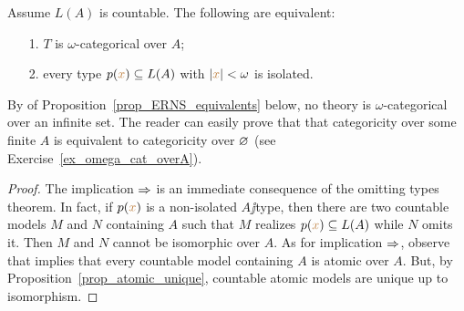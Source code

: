 \documentclass[creche.tex]{subfiles}
\begin{document}
\begin{theorem} Assume $L(A)$ is countable. The following are equivalent:
\begin{itemize}   
\item[1.] $T$ is $\omega$-categorical over $A$;
\item[2.] every type $p({\color{brown} x})\subseteq L(A)$ with $|{\color{brown} x}|<\omega$ is isolated. 
\end{itemize}
\end{theorem}
By  of Proposition~\ref{prop_ERNS_equivalents} below, no theory is $\omega$-categorical over an infinite set. The reader can easily prove that that categoricity over some finite $A$ is equivalent to categoricity over $\varnothing$ (see Exercise~\ref{ex_omega_cat_overA}).

\begin{proof} The implication $\Rightarrow$ is an immediate consequence of the omitting types theorem. In fact, if $p({\color{brown} x})$ is a non-isolated $A\jj$type, then there are two countable models $M$ and $N$ containing $A$ such that $M$ realizes $p({\color{brown} x})\subseteq L(A)$ while $N$ omits it. Then $M$ and $N$ cannot be isomorphic over $A$. As for implication $\Rightarrow$, observe that  implies that every countable model containing $A$ is atomic over $A$. But, by Proposition~\ref{prop_atomic_unique}, countable atomic models are unique up to isomorphism.
\end{proof}
\end{document}

